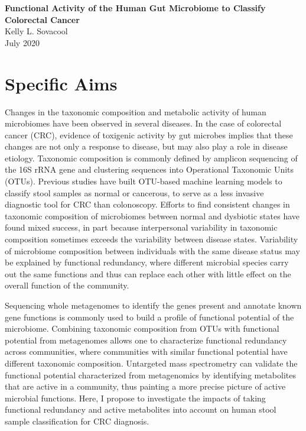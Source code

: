 \documentclass[12pt]{article}
\begin{document}
\sloppy

\begin{center}
\large{\textbf{
    Functional Activity of the Human Gut Microbiome to Classify Colorectal Cancer
}} \\
\vspace{12pt}
\small{
    Kelly L. Sovacool \\
    July 2020
}
\end{center}

\section*{Specific Aims}

Changes in the taxonomic composition and metabolic activity of human microbiomes have been observed in several diseases.
In the case of colorectal cancer (CRC), evidence of toxigenic activity by gut microbes implies that these changes are not only a response to disease, but may also play a role in disease etiology.
Taxonomic composition is commonly defined by amplicon sequencing of the 16S rRNA gene and clustering sequences into Operational Taxonomic Units (OTUs).
Previous studies have built OTU-based machine learning models to classify stool samples as normal or cancerous, to serve as a less invasive diagnostic tool for CRC than colonoscopy.
Efforts to find consistent changes in taxonomic composition of microbiomes between normal and dysbiotic states have found mixed success, in part because interpersonal variability in taxonomic composition sometimes exceeds the variability between disease states.
Variability of microbiome composition between individuals with the same disease status may be explained by functional redundancy, where different microbial species carry out the same functions and thus can replace each other with little effect on the overall function of the community.

Sequencing whole metagenomes to identify the genes present and annotate known gene functions is commonly used to build a profile of functional potential of the microbiome.
Combining taxonomic composition from OTUs with functional potential from metagenomes allows one to characterize functional redundancy across communities, where communities with similar functional potential have different taxonomic composition.
Untargeted mass spectrometry can validate the functional potential characterized from metagenomics by identifying metabolites that are active in a community, thus painting a more precise picture of active microbial functions.
Here, I propose to investigate the impacts of taking functional redundancy and active metabolites into account on human stool sample classification for CRC diagnosis.
\end{document}
